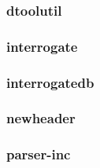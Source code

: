 \documentclass[a4paper]{article}
\begin{document}
\hypertarget{RefHeading19951167907073}{}\subsubsection{}
\clearpage\subsubsection[dtoolutil]{dtoolutil}
\hypertarget{RefHeading19971167907073}{}\subsubsection{}
\clearpage\subsubsection[interrogate]{interrogate}
\hypertarget{RefHeading19991167907073}{}\subsubsection{}
\clearpage\subsubsection[interrogatedb]{interrogatedb}
\hypertarget{RefHeading20011167907073}{}\subsubsection{}
\clearpage\subsubsection[newheader]{newheader}
\hypertarget{RefHeading20031167907073}{}\subsubsection{}
\clearpage\subsubsection[parser{}-inc]{parser-inc}
\hypertarget{RefHeading20051167907073}{}


\bigskip



\bigskip
\end{document}
